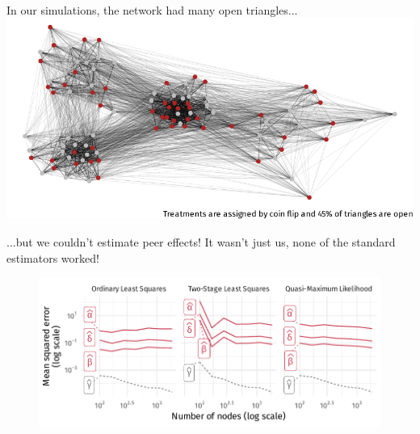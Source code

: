 \documentclass[aspectratio=169]{beamer}
\theoremstyle{remark}
\begin{document}
\begin{frame}{In our simulations, the network had many open triangles...}
    \centering
    \includegraphics{./figures/simulations/jobtalk-backbone.pdf}
\end{frame}

\begin{frame}{...but we couldn't estimate peer effects!}
    It wasn't just us, none of the standard estimators worked!
    \begin{figure}
        \centering
        \includegraphics[width=\textwidth]{./figures/simulations/jobtalk-mse.pdf}
    \end{figure}
\end{frame}
\end{document}

